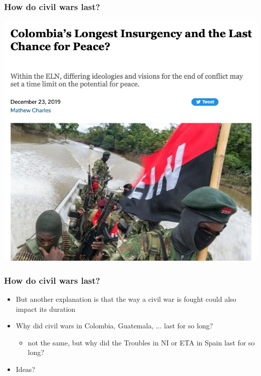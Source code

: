 \documentclass[aspectratio=43]{beamer}
\begin{document}
\begin{frame}
\frametitle{How  do civil wars last?}
\centering

\includegraphics[width = \textwidth]{img/colombia_duration}

\end{frame}

\begin{frame}
\frametitle{How  do civil wars last?}
\centering

\begin{itemize}
  \item But another explanation is that the way a civil war is fought could also impact its duration
  \item Why did civil wars in Colombia, Guatemala, ... last for so long?
  \begin{itemize}
    \item not the same, but why did the Troubles in NI or ETA in Spain last for so long?
  \end{itemize}
  \item Ideas?
\end{itemize}

\end{frame}
\end{document}
